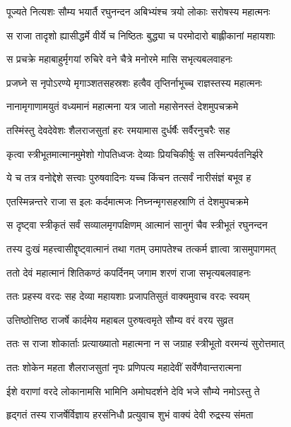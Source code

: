 \twolineshloka
{पूज्यते नित्यशः सौम्य भयार्तै रघुनन्दन}
{अबिभ्यंश्च त्रयो लोकाः सरोषस्य महात्मनः} %

\twolineshloka
{स राजा तादृशो ह्यासीद्धर्मे वीर्ये च निष्ठितः}
{बुद्ध्या च परमोदारो बाह्लीकानां महायशाः} %

\twolineshloka
{स प्रचक्रे महाबाहुर्मृगयां रुचिरे वने}
{चैत्रे मनोरमे मासि सभृत्यबलवाहनः} %

\twolineshloka
{प्रजघ्ने स नृपोऽरण्ये मृगाञ्शतसहस्रशः}
{हत्वैव तृप्तिर्नाभूच्च राज्ञस्तस्य महात्मनः} %

\twolineshloka
{नानामृगाणामयुतं वध्यमानं महात्मना}
{यत्र जातो महासेनस्तं देशमुपचक्रमे} %

\twolineshloka
{तस्मिंस्तु देवदेवेशः शैलराजसुतां हरः}
{रमयामास दुर्धर्षैः सर्वैरनुचरैः सह} %

\twolineshloka
{कृत्वा स्त्रीभूतमात्मानमुमेशो गोपतिध्वजः}
{देव्याः प्रियचिकीर्षुः स तस्मिन्पर्वतनिर्झरे} %

\twolineshloka
{ये च तत्र वनोद्देशे सत्त्वाः पुरुषवादिनः}
{यच्च किंचन तत्सर्वं नारीसंज्ञं बभूव ह} %

\twolineshloka
{एतस्मिन्नन्तरे राजा स इलः कर्दमात्मजः}
{निघ्नन्मृगसहस्राणि तं देशमुपचक्रमे} %

\twolineshloka
{स दृष्ट्वा स्त्रीकृतं सर्वं सव्यालमृगपक्षिणम्}
{आत्मानं सानुगं चैव स्त्रीभूतं रघुनन्दन} %

\twolineshloka
{तस्य दुःखं महत्त्वासीद्दृष्ट्वात्मानं तथा गतम्}
{उमापतेश्च तत्कर्म ज्ञात्वा त्रासमुपागमत्} %

\twolineshloka
{ततो देवं महात्मानं शितिकण्ठं कपर्दिनम्}
{जगाम शरणं राजा सभृत्यबलवाहनः} %

\twolineshloka
{ततः प्रहस्य वरदः सह देव्या महायशाः}
{प्रजापतिसुतं वाक्यमुवाच वरदः स्वयम्} %

\twolineshloka
{उत्तिष्ठोत्तिष्ठ राजर्षे कार्दमेय महाबल}
{पुरुषत्वमृते सौम्य वरं वरय सुव्रत} %

\twolineshloka
{ततः स राजा शोकार्ताः प्रत्याख्यातो महात्मना}
{न स जग्राह स्त्रीभूतो वरमन्यं सुरोत्तमात्} %

\twolineshloka
{ततः शोकेन महता शैलराजसुतां नृपः}
{प्रणिपत्य महादेवीं सर्वेणैवान्तरात्मना} %

\twolineshloka
{ईशे वराणां वरदे लोकानामसि भामिनि}
{अमोघदर्शने देवि भजे सौम्ये नमोऽस्तु ते} %

\twolineshloka
{हृद्गतं तस्य राजर्षेर्विज्ञाय हरसंनिधौ}
{प्रत्युवाच शुभं वाक्यं देवी रुद्रस्य संमता} %

